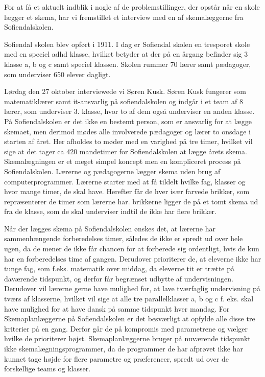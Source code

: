 For at få et aktuelt indblik i nogle af de problemstillinger, der opstår når en skole lægger et skema, har vi fremstillet et interview med en af skemalæggerne fra Sofiendalskolen.


Sofiendal skolen blev opført i 1911. I dag er Sofiendal skolen en tresporet skole med en speciel adhd klasse, hvilket betyder at der på en årgang befinder sig 3 klasse a, b og c samt speciel klassen. Skolen rummer 70 lærer samt pædagoger, som underviser 650 elever dagligt.


Lørdag den 27 oktober interviewede vi Søren Kusk. Søren Kusk fungerer som matematiklærer samt it-ansvarlig på sofiendalskolen og indgår i et team af 8 lærer, som underviser 3. klasse, hvor to af dem også underviser en anden klasse. På Sofiendalskolen er det ikke en bestemt person, som er ansvarlig for at lægge skemaet, men derimod mødes alle involverede pædagoger og lærer to onsdage i starten af året. Her afholdes to møder med en varighed på tre timer, hvilket vil sige at det tager ca 420 mandetimer for Sofiendalskolen at lægge årets skema. Skemalægningen er et meget simpel koncept men en kompliceret process på Sofiendalskolen. Lærerne og pædagogerne lægger skema uden brug af computerprogrammer. Lærerne starter med at få tildelt hvilke fag, klasser og hvor mange timer, de skal have. Herefter får de hver især farvede brikker, som repræsenterer de timer som lærerne har. brikkerne ligger de på et tomt skema ud fra de klasse, som de skal underviser indtil de ikke har flere brikker.


Når der lægges skema på Sofiendalskolen ønskes det, at lærerne har sammenhængende forberedelses timer, således de ikke er spredt ud over hele ugen, da de mener de ikke får chancen for at forberede sig ordentligt, hvis de kun har en forberedelses time af gangen. Derudover prioriterer de, at eleverne ikke har tunge fag, som f.eks. matematik over middag, da eleverne tit er trætte på daværende tidspunkt, og derfor får begrænset udbytte af undervisningen. Derudover vil lærerne gerne have mulighed for, at lave tværfaglig undervisning på tværs af klasserne, hvilket vil sige at alle tre parallelklasser a, b og c f. eks. skal have mulighed for at have dansk på samme tidspunkt hver mandag. For Skemaplanlæggerne på Sofiendalskolen er det besværligt at opfylde alle disse tre kriterier på en gang. Derfor går de på kompromis med parametrene og vælger hvilke de prioriterer højst. Skemaplanlæggerne bruger på nuværende tidspunkt ikke skemalægningsprogrammer, da de programmer de har afprøvet ikke har kunnet tage højde for flere parametre og præferencer, spredt ud over de forskellige teams og klasser.


